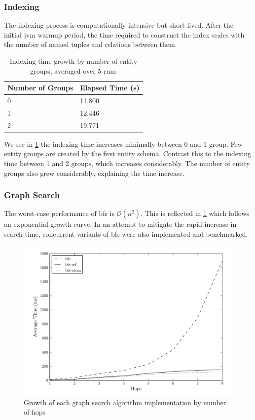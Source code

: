 			\subsubsection{Indexing}
				The indexing process is computationally intensive but short lived.  After the initial \gls{jvm} warmup period, the time required to construct the index scales with the number of named tuples and relations between them.
				
				\begin{table}
					\centering
					\begin{tabular}{ll}
						\toprule
						Number of Groups & Elapsed Time (s) \\
						\midrule
						0 & 11.800 \\
						1 & 12.446 \\
						2 & 19.771 \\
						\bottomrule
					\end{tabular}
					
					\caption{Indexing time growth by number of entity groups, averaged over 5 runs}
					\label{tbl:index-growth-entity-groups}
				\end{table}
				
				We see in \cref{tbl:index-growth-entity-groups} the indexing time increases minimally between 0 and 1 group.  Few entity groups are created by the first entity schema.  Contrast this to the indexing time between 1 and 2 groups, which increases considerably.  The number of entity groups also grew considerably, explaining the time increase.
			
			\subsubsection{Graph Search}
				The worst-case performance of \gls{bfs} is \(\mathcal{O}(n^2)\).  This is reflected in \cref{fig:growth} which follows an exponential growth curve.  In an attempt to mitigate the rapid increase in search time, concurrent variants of \gls{bfs} were also implemented and benchmarked.
				
				\begin{figure}
					\centering
					\includegraphics[scale=0.9]{figures/charts/growth.pdf}
					\caption{Growth of each graph search algorithm implementation by number of hops}
					\label{fig:growth}
				\end{figure}
				
